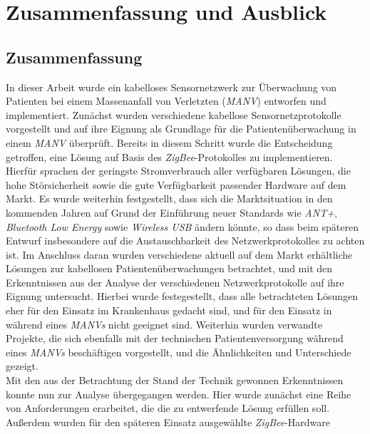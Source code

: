 
\chapter{Zusammenfassung und Ausblick}\label{Ausblick}

\section{Zusammenfassung}
In dieser Arbeit wurde ein kabelloses Sensornetzwerk zur Überwachung von Patienten bei einem 
Massenanfall von Verletzten (\emph{MANV}) entworfen und implementiert. Zunächst wurden 
verschiedene kabellose Sensornetzprotokolle vorgestellt und auf ihre Eignung als Grundlage für
die Patientenüberwachung in einem \emph{MANV} überprüft. Bereits in diesem Schritt wurde die Entscheidung
getroffen, eine Lösung auf Basis des \emph{ZigBee}-Protokolles zu implementieren. Hierfür sprachen
der geringste Stromverbrauch aller verfügbaren Lösungen, die hohe Störsicherheit sowie die
gute Verfügbarkeit passender Hardware auf dem Markt. Es wurde weiterhin festgestellt, dass sich die
Marktsituation in den kommenden Jahren auf Grund der Einführung neuer Standards wie \emph{ANT+},
\emph{Bluetooth Low Energy} sowie \emph{Wireless USB} ändern könnte, so dass beim späteren Entwurf
insbesondere auf die Austauschbarkeit des Netzwerkprotokolles zu achten ist. Im Anschluss daran wurden
verschiedene aktuell auf dem Markt erhältliche Lösungen zur kabellosen Patientenüberwachungen betrachtet, 
und mit den Erkenntnissen aus der Analyse der verschiedenen Netzwerkprotokolle auf ihre Eignung untersucht.
Hierbei wurde festegestellt, dass alle betrachteten Lösungen eher für den Einsatz im Krankenhaus
gedacht sind, und für den Einsatz in während eines \emph{MANVs} nicht geeignet sind. Weiterhin wurden verwandte
Projekte, die sich ebenfalls mit der technischen Patientenversorgung während eines \emph{MANVs} beschäftigen
vorgestellt, und die Ähnlichkeiten und Unterschiede gezeigt.\\
Mit den aus der Betrachtung der Stand der Technik gewonnen Erkenntnissen konnte nun zur Analyse 
übergegangen werden. Hier wurde zunächst eine Reihe von Anforderungen erarbeitet, die die zu entwerfende 
Lösung erfüllen soll. Außerdem wurden für den späteren Einsatz ausgewählte \emph{ZigBee}-Hardware 
